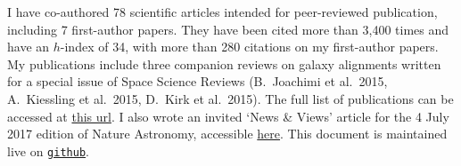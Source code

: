 I have co-authored 78 scientific articles intended for peer-reviewed 
publication, including 7 first-author papers. They have been cited more than 
3,400 times and have an $h$-index of 34, with more than 280 citations on my 
first-author papers. My publications include three companion reviews on galaxy 
alignments written for a special issue of Space Science Reviews (B.\ Joachimi et 
al.\ 2015, A.\ Kiessling et al.\ 2015, D.\ Kirk et al.\ 2015). The full list of 
publications can be accessed at \href{https://goo.gl/LAu9G4}{this url}. I also 
wrote an invited `News \& Views' article for the 4 July 2017 edition of Nature 
Astronomy, accessible 
\href{https://www.nature.com/articles/s41550-017-0181}{here}.
%
This document is maintained live on
\href{https://github.com/cristobal-sifon/cv/blob/master/Sifon_publications.pdf}{\texttt{github}}.

